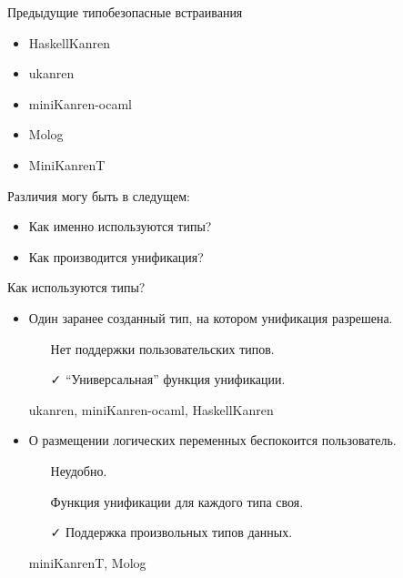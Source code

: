 \documentclass[10pt, mathserif]{beamer}
\theoremstyle{definition}
\begin{document}
\begin{frame}[fragile]{Предыдущие типобезопасные встраивания}
\begin{itemize}
 \item HaskellKanren    \href{https://github.com/JaimieMurdock/HK}{\faGithub}
 \item ukanren          \href{https://github.com/rntz/ukanren}{\faGithub}
 \item miniKanren-ocaml \href{https://github.com/lightyang/minikanren-ocaml}{\faGithub}
 \item Molog            \href{https://github.com/acfoltzer/Molog}{\faGithub}
 \item MiniKanrenT      \href{https://github.com/jvranish/MiniKanrenT}{\faGithub}
\end{itemize}
\pause
\vspace{1in}
Различия могу быть в следущем:
\begin{itemize}
 \item Как именно используются типы?
 \item Как производится унификация?
\end{itemize}

\end{frame}



\begin{frame}[fragile]{Как используются типы?}
\begin{itemize}
\item Один заранее созданный тип, на котором унификация разрешена.
  \begin{itemize}
    \item[\faTimes] Нет поддержки пользовательских типов.

    \item[\faCheck] ``Универсальная'' функция унификации.
  \end{itemize}
    \vspace{1em}
    ukanren, miniKanren-ocaml, HaskellKanren
    \vspace{1em}
\pause
\item О размещении логических переменных беспокоится пользователь.
  \begin{itemize}
    \item[\faTimes] Неудобно.
    \item[\faTimes] Функция унификации для каждого типа своя.
    \item[\faCheck] Поддержка произвольных типов данных.
  \end{itemize}
  \vspace{1em}
  miniKanrenT, Molog
\end{itemize}
\end{frame}
\end{document}
